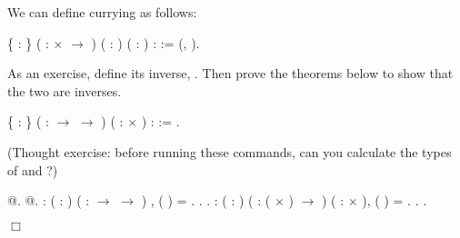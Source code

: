 \documentclass[12pt]{report}
\begin{document}
 We can define currying as follows: \begin{coqdoccode}
\coqdocemptyline
\coqdocnoindent
{}  \{   : \}\coqdoceol
\coqdocindent{1.00em}
( :  \ensuremath{\times}  \ensuremath{\rightarrow} ) ( : ) ( : ) :  :=  (, ).\coqdoceol
\coqdocemptyline
\end{coqdoccode}
As an exercise, define its inverse, .  Then prove
    the theorems below to show that the two are inverses. \begin{coqdoccode}
\coqdocemptyline
\coqdocnoindent
{}  \{   : \}\coqdoceol
\coqdocindent{1.00em}
( :  \ensuremath{\rightarrow}  \ensuremath{\rightarrow} ) ( :  \ensuremath{\times} ) :  :=\coqdoceol
\coqdocindent{1.00em}
 .\coqdoceol
\coqdocemptyline
\end{coqdoccode}
(Thought exercise: before running these commands, can you
    calculate the types of  and ?) \begin{coqdoccode}
\coqdocemptyline
\coqdocnoindent
{} @.\coqdoceol
\coqdocnoindent
{} @.\coqdoceol
\coqdocemptyline
\coqdocnoindent
{}  : \coqdockw{\ensuremath{\forall}} (   : ) ( :  \ensuremath{\rightarrow}  \ensuremath{\rightarrow} )  ,\coqdoceol
\coqdocindent{1.00em}
 ( )   =   .\coqdoceol
\coqdocnoindent
{}.\coqdoceol
 .\coqdoceol
\coqdocemptyline
\coqdocnoindent
{}  : \coqdockw{\ensuremath{\forall}} (   : )\coqdoceol
\coqdocindent{15.50em}
( : ( \ensuremath{\times} ) \ensuremath{\rightarrow} ) ( :  \ensuremath{\times} ),\coqdoceol
\coqdocindent{1.00em}
 ( )  =  .\coqdoceol
\coqdocnoindent
{}.\coqdoceol
 .\coqdoceol
\end{coqdoccode}
\ensuremath{\Box} \begin{coqdoccode}
\coqdocemptyline
\end{coqdoccode}
\end{document}
